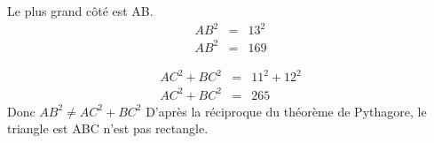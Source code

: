 \documentclass[12pt]{article}
\begin{document}
\begin{multicols}{2}
\begin{multicols}{2}
    Le plus grand côté est AB.
    \begin{eqnarray*}
      AB^2 &=& 13^2 \\
      AB^2 &=& 169
    \end{eqnarray*}

    \begin{eqnarray*}
      AC^2 + BC^2 &=& 11^2 + 12^2 \\
      AC^2 + BC^2 &=& 265
    \end{eqnarray*}
    Donc $AB^2 \neq AC^2 + BC^2$
    D'après la réciproque du théorème de Pythagore, le triangle est ABC n'est pas rectangle.

  \end{multicols}
\end{multicols}
\end{document}
